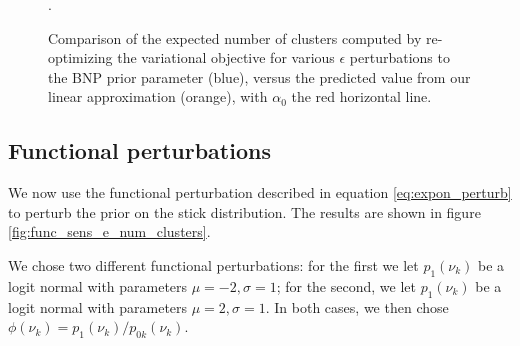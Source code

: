 \documentclass{article}
\begin{document}
\begin{figure}[h!]
\begin{subfigure}[t]{0.32\textwidth}
	\end{subfigure}
	\caption{Comparison of the expected number of clusters computed by re-optimizing
  the variational objective for various $\epsilon$ perturbations to the BNP prior parameter
  (blue),
  versus the predicted value from our linear approximation (orange), with $\alpha_0$ the
  red horizontal line. }.
	\label{fig:parametric_sens_e_num_clusters}
\end{figure}



\subsection{Functional perturbations}
%
We now use the functional perturbation described in equation
\ref{eq:expon_perturb} to perturb the prior on the stick distribution. The
results are shown in figure \ref{fig:func_sens_e_num_clusters}.

We chose two different functional perturbations: for the first we let
$p_1(\nu_k)$ be a logit normal with parameters $\mu = -2, \sigma = 1$; for the
second, we let $p_1(\nu_k)$ be a logit normal with parameters $\mu = 2, \sigma =
1$. In both cases, we then chose $\phi(\nu_k) = p_1(\nu_k) / p_{0k}(\nu_k)$.
\end{document}
